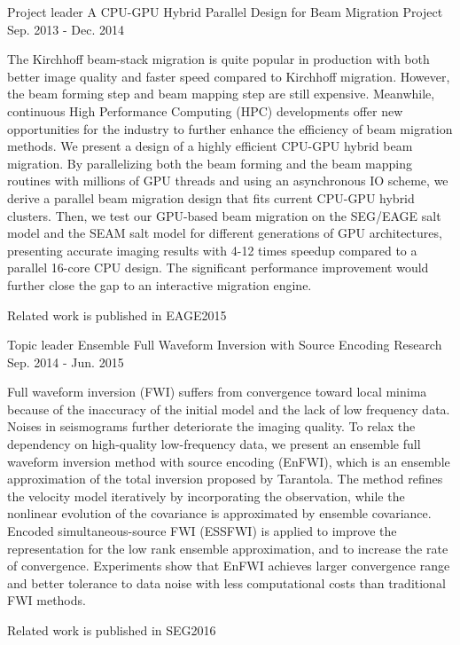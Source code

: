 \documentclass[11pt, a4paper]{awesome-cv}
\begin{document}
\begin{cventries}

  \cventry
    {Project leader} %
    {A CPU-GPU Hybrid Parallel Design for Beam Migration} %
    {Project} %
    {Sep. 2013 - Dec. 2014} %
    {
      \begin{cvitems} %
        \item {The Kirchhoff beam-stack migration is quite popular in production with both better image quality and faster speed compared to Kirchhoff migration.  However, the beam forming step and beam mapping step are still expensive. Meanwhile, continuous High Performance Computing (HPC) developments offer new opportunities for the industry to further enhance the efficiency of beam migration methods. We present a design of a highly efficient CPU-GPU hybrid beam migration.  By parallelizing both the beam forming and the beam mapping routines with millions of GPU threads and using an asynchronous IO scheme, we derive a parallel beam migration design that fits current CPU-GPU hybrid clusters.  Then, we test our GPU-based beam migration on the SEG/EAGE salt model and the SEAM salt model for different generations of GPU architectures, presenting accurate imaging results with 4-12 times speedup compared to a parallel 16-core CPU design. The significant performance improvement would further close the gap to an interactive migration engine.}
        \item {Related work is published in EAGE2015}
      \end{cvitems}
    }

  \cventry
    {Topic leader} %
    {Ensemble Full Waveform Inversion with Source Encoding} %
    {Research} %
    {Sep. 2014 - Jun. 2015} %
    {
      \begin{cvitems} %
        \item {Full waveform inversion (FWI) suffers from convergence toward local minima because of the inaccuracy of the initial model and the lack of low frequency data. Noises in seismograms further deteriorate the imaging quality. To relax the dependency on high-quality low-frequency data, we present an ensemble full waveform inversion method with source encoding (EnFWI), which is an ensemble approximation of the total inversion proposed by Tarantola. The method refines the velocity model iteratively by incorporating the observation, while the nonlinear evolution of the covariance is approximated by ensemble covariance. Encoded simultaneous-source FWI (ESSFWI) is applied to improve the representation for the low rank ensemble approximation, and to increase the rate of convergence. Experiments show that EnFWI achieves larger convergence range and better tolerance to data noise with less computational costs than traditional FWI methods.}
        \item {Related work is published in SEG2016}
      \end{cvitems}
    }


\end{cventries}
\end{document}
